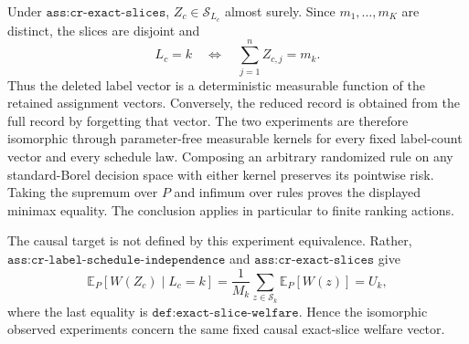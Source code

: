 Under \(\texttt{ass:cr-exact-slices}\), \(Z_c\in\mathcal S_{L_c}\) almost surely.  Since \(m_1,\ldots,m_K\) are distinct, the slices are disjoint and
\[
L_c=k\quad\Longleftrightarrow\quad\sum_{j=1}^nZ_{c,j}=m_k. \tag{15}
\]
Thus the deleted label vector is a deterministic measurable function of the retained assignment vectors.  Conversely, the reduced record is obtained from the full record by forgetting that vector.  The two experiments are therefore isomorphic through parameter-free measurable kernels for every fixed label-count vector and every schedule law.  Composing an arbitrary randomized rule on any standard-Borel decision space with either kernel preserves its pointwise risk.  Taking the supremum over \(P\) and infimum over rules proves the displayed minimax equality.  The conclusion applies in particular to finite ranking actions.

The causal target is not defined by this experiment equivalence.  Rather, \(\texttt{ass:cr-label-schedule-independence}\) and \(\texttt{ass:cr-exact-slices}\) give
\[
\mathbb E_P[W(Z_c)\mid L_c=k]
=\frac1{M_k}\sum_{z\in\mathcal S_k}\mathbb E_P[W(z)]
=U_k, \tag{16}
\]
where the last equality is \(\texttt{def:exact-slice-welfare}\).  Hence the isomorphic observed experiments concern the same fixed causal exact-slice welfare vector.